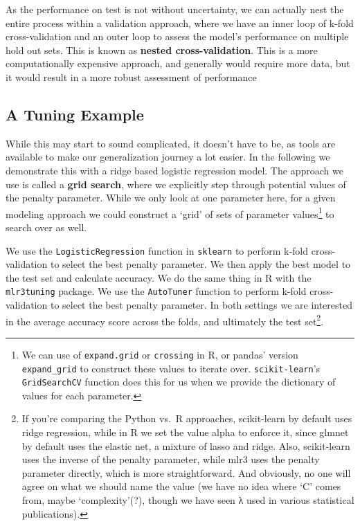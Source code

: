 \documentclass[
  letterpaper,
]{krantz}
\begin{document}
\begin{tcolorbox}[enhanced jigsaw, opacityback=0, leftrule=.75mm, bottomrule=.15mm, colframe=quarto-callout-note-color-frame, rightrule=.15mm, breakable, left=2mm, colback=white, arc=.35mm, toprule=.15mm]

As the performance on test is not without uncertainty, we can actually
nest the entire process within a validation approach, where we have an
inner loop of k-fold cross-validation and an outer loop to assess the
model's performance on multiple hold out sets. This is known as
\textbf{nested cross-validation}. This is a more computationally
expensive approach, and generally would require more data, but it would
result in a more robust assessment of performance

\end{tcolorbox}

\subsection{A Tuning Example}\label{a-tuning-example}

While this may start to sound complicated, it doesn't have to be, as
tools are available to make our generalization journey a lot easier. In
the following we demonstrate this with a ridge based logistic regression
model. The approach we use is called a \textbf{grid search}, where we
explicitly step through potential values of the penalty parameter. While
we only look at one parameter here, for a given modeling approach we
could construct a `grid' of sets of parameter values\footnote{We can use
  of \texttt{expand.grid} or \texttt{crossing} in R, or pandas' version
  \texttt{expand\_grid} to construct these values to iterate over.
  \texttt{scikit-learn}'s \texttt{GridSearchCV} function does this for
  us when we provide the dictionary of values for each parameter.} to
search over as well.

We use the \texttt{LogisticRegression} function in \texttt{sklearn} to
perform k-fold cross-validation to select the best penalty parameter. We
then apply the best model to the test set and calculate accuracy. We do
the same thing in R with the \texttt{mlr3tuning} package. We use the
\texttt{AutoTuner} function to perform k-fold cross-validation to select
the best penalty parameter. In both settings we are interested in the
average accuracy score across the folds, and ultimately the test
set\footnote{If you're comparing the Python vs.~R approaches,
  scikit-learn by default uses ridge regression, while in R we set the
  value alpha to enforce it, since glmnet by default uses the elastic
  net, a mixture of lasso and ridge. Also, scikit-learn uses the inverse
  of the penalty parameter, while mlr3 uses the penalty parameter
  directly, which is more straightforward. And obviously, no one will
  agree on what we should name the value (we have no idea where `C'
  comes from, maybe `complexity'(?), though we have seen λ used in
  various statistical publications).}.
\end{document}
